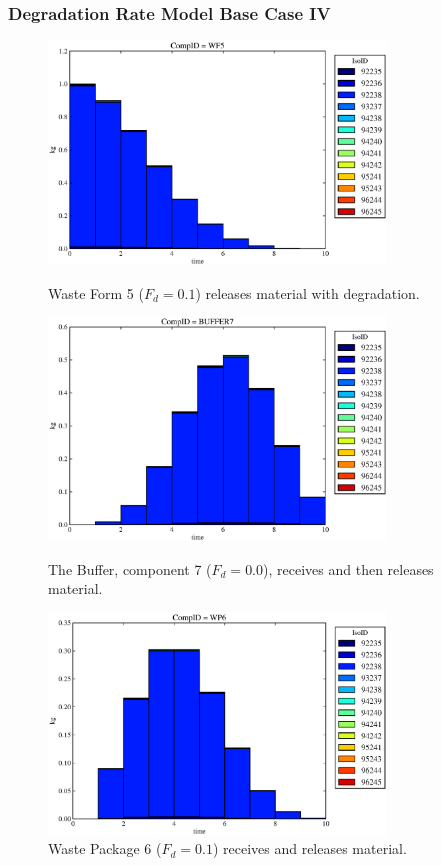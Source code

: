 \begin{frame}
  \frametitle{Degradation Rate Model Base Case IV}
  \begin{figure}
\begin{minipage}[b]{0.45\linewidth}

  \includegraphics[width=0.8\textwidth]{./images/drIV1.eps}
  \caption[DRIV Waste Form Contaminants.]{
    Waste Form 5 ($F_d = 0.1$) releases material with degradation. 
    }
  \label{fig:drIVwf5}
  
  \includegraphics[width=0.8\textwidth]{./images/drIV3.eps}
  \caption[Case DRIV Buffer Contaminants]{
    The Buffer, component 7 ($F_d=0.0$), receives and then releases material.
    }
  \label{fig:drIVbuff}

\end{minipage}
\hspace{0.05\linewidth}
\begin{minipage}[b]{0.45\linewidth}
  \includegraphics[width=0.8\textwidth]{./images/drIV2.eps}
  \caption[Case DRIV Waste Package Contaminants.]{ 
    Waste Package 6 ($F_d = 0.1$) receives and releases material. 
    }
  \label{fig:drIVwp6}


\end{minipage}
\end{figure}
\end{frame}
